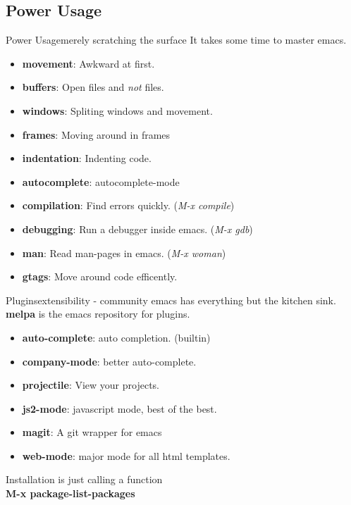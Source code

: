 \documentclass{beamer}
\begin{document}
\subsection{Power Usage}
\begin{frame}{Power Usage}{merely scratching the surface}
	It takes some time to master emacs. \\
	\pause
	\begin{itemize}
			\item {
					\textbf{movement}: Awkward at first.
					\pause
					}
			\item {
					\textbf{buffers}: Open files and \textit{not} files.
					\pause
					}
			\item {
					\textbf{windows}: Spliting windows and movement.
					\pause
					}
			\item {
					\textbf{frames}: Moving around in frames
					\pause
					}
			\item {
					\textbf{indentation}: Indenting code.
					\pause
					}
			\item {
					\textbf{autocomplete}: autocomplete-mode
					\pause
					}
			\item {
					\textbf{compilation}: Find errors quickly. (\textit{M-x compile})
					\pause
					}
			\item {
					\textbf{debugging}: Run a debugger inside emacs. (\textit{M-x gdb})
					\pause
					}
			\item {
					\textbf{man}: Read man-pages in emacs. (\textit{M-x woman})
					\pause
					}
			\item {
					\textbf{gtags}: Move around code efficently.
					}
	\end{itemize}
\end{frame}
\begin{frame}{Plugins}{extensibility - community}
	emacs has everything but the kitchen sink.\\ 
	\pause
	\textbf{melpa} is the emacs repository for plugins.\\
	\begin{itemize}
		\item {
				\textbf{auto-complete}: auto completion. (builtin)
				\pause
				}
		\item {
				\textbf{company-mode}: better auto-complete.
				\pause
				}
		\item {
				\textbf{projectile}: View your projects.
				\pause
				}
		\item {
				\textbf{js2-mode}: javascript mode, best of the best.
				\pause
				}
		\item {
				\textbf{magit}: A git wrapper for emacs
				\pause
				}
		\item{
				\textbf{web-mode}: major mode for all html templates.
				\pause
				}
	\end{itemize}
	Installation is just calling a function \\
	\textbf{M-x package-list-packages}\\
\end{frame}
\end{document}
